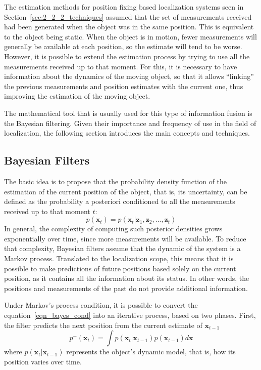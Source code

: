 \begin{description}
	The estimation methods for position fixing based localization systems seen in Section~\ref{sec:2_2_2_techniques} assumed that the set of measurements received had been generated when the object was in the same position. This is equivalent to the object being static.
	When the object is in motion, fewer measurements will generally be available at each position, so the estimate will tend to be worse.
	However, it is possible to extend the estimation process by trying to use all the measurements received up to that moment. 	
	For this, it is necessary to have information about the dynamics of the moving object, so that it allows ``linking'' the previous measurements and position estimates with the current one, thus improving the estimation of the moving object.
	
	The mathematical tool that is usually used for this type of information fusion is the Bayesian filtering. 
	Given their importance and frequency of use in the field of localization, the following section introduces the main concepts and techniques.	
\end{description}		
\subsection{Bayesian Filters}
\label{sec:2_4_1_fusion_bayesian}
The basic idea is to propose that the probability density function of the estimation of the current position of the object, that is, its uncertainty, can be defined as the probability a posteriori conditioned to all the measurements received up to that moment $t$:
\begin{equation}
\label{eqn_bayes_cond}
	p(\boldsymbol{x}_t)=p(\boldsymbol{x}_t|\boldsymbol{z}_1, \boldsymbol{z}_2,...,\boldsymbol{z}_t)
\end{equation}
In general, the complexity of computing such posterior densities grows exponentially over time, since more measurements will be available.
To reduce that complexity, Bayesian filters assume that the dynamic of the system is a Markov process.
Translated to the localization scope, this means that it is possible to make predictions of future positions based solely on the current position, as it contains all the information about its status. In other words, the positions and measurements of the past do not provide additional information.

Under Markov's process condition, it is possible to convert the equation~\ref{eqn_bayes_cond} into an iterative process, based on two phases.
First, the filter predicts the next position from the current estimate of $\boldsymbol{x}_{t-1}$
\begin{equation}
\label{eqn_bayes_pred}
	p^{-}(\boldsymbol{x}_t)=\int p(\boldsymbol{x}_t|\boldsymbol{x}_{t-1})p(\boldsymbol{x}_{t-1})d\boldsymbol{x}
\end{equation}
where $p(\boldsymbol{x}_t|\boldsymbol{x}_{t-1})$ represents the object's dynamic model, that is, how its position varies over time.

